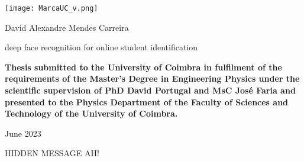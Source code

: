\documentclass[class=report, crop=false, a4paper]{standalone}
\begin{document}

\pagecolor{CoverUC}\afterpage{\nopagecolor}

\begin{center}
    \color{CoverUCTypo}
    \texttt{[image: MarcaUC\_v.png]}
    \vspace{3cm}

    \fontsize{18pt}{18pt}\selectfont
    \par{\ArrusBt David Alexandre Mendes Carreira}
    \vspace{3cm}

    \fontsize{22pt}{22pt}\selectfont
    \par{\ArrusBtScB deep face recognition for online student identification}
    \fontsize{20pt}{20pt}\selectfont
    \vspace{2cm}

    \vfill
    \fontsize{12pt}{12pt}\selectfont
    \par\textbf{\ArrusBt Thesis submitted to the University of Coimbra in fulfilment of the
    requirements of the Master’s Degree in Engineering Physics
    under the scientific supervision of PhD David Portugal and MsC
    José Faria and presented to the Physics Department of the
    Faculty of Sciences and Technology of the University of Coimbra.}
    
    \vfill
    \fontsize{16pt}{16pt}\selectfont
    \par {\ArrusBt June 2023}
\end{center}
\restoregeometry

\newpage
\color{white}\selectfont
HIDDEN MESSAGE AH!
\newpage
\end{document}
